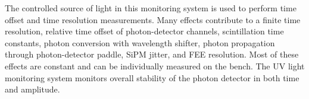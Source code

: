 

The controlled source of light %
in this monitoring system is used to perform time offset and time resolution measurements.  
Many effects contribute to a finite time resolution, relative time offset of photon-detector channels, scintillation time constants, 
photon conversion with wavelength shifter, photon propagation through photon-detector paddle, SiPM jitter, and FEE resolution. 
Most of these effects are constant and can be individually 
measured on the bench.  The UV light monitoring system monitors overall stability of the photon detector in both time
and amplitude.

